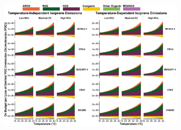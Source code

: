 \documentclass[11pt,a4paper]{article}
\begin{document}
\begin{figure}[ht]
\begin{subfigure}[t]{\textwidth}
        \includegraphics[width = \textwidth]{img/Absolute_Ox_Budget_categories-No_mixing}
        \label{f:abs_Ox_no_mix}
    \end{subfigure}
\end{figure}

\clearpage

 
\end{document}
